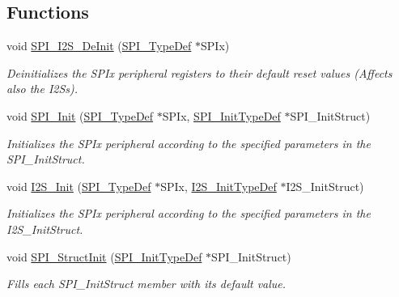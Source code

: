 \subsection*{Functions}
\begin{DoxyCompactItemize}
\item 
void \hyperlink{group___s_p_i___exported___functions_gabe36880945fa56785283a9c0092124cc}{S\+P\+I\+\_\+\+I2\+S\+\_\+\+De\+Init} (\hyperlink{struct_s_p_i___type_def}{S\+P\+I\+\_\+\+Type\+Def} $\ast$S\+P\+Ix)
\begin{DoxyCompactList}\small\item\em Deinitializes the S\+P\+Ix peripheral registers to their default reset values (Affects also the I2\+Ss). \end{DoxyCompactList}\item 
void \hyperlink{group___s_p_i___exported___functions_ga8dacc1dc48bf08c0f12da409f4889037}{S\+P\+I\+\_\+\+Init} (\hyperlink{struct_s_p_i___type_def}{S\+P\+I\+\_\+\+Type\+Def} $\ast$S\+P\+Ix, \hyperlink{struct_s_p_i___init_type_def}{S\+P\+I\+\_\+\+Init\+Type\+Def} $\ast$S\+P\+I\+\_\+\+Init\+Struct)
\begin{DoxyCompactList}\small\item\em Initializes the S\+P\+Ix peripheral according to the specified parameters in the S\+P\+I\+\_\+\+Init\+Struct. \end{DoxyCompactList}\item 
void \hyperlink{group___s_p_i___exported___functions_ga53661884ae4a9640df7cbc59187782f7}{I2\+S\+\_\+\+Init} (\hyperlink{struct_s_p_i___type_def}{S\+P\+I\+\_\+\+Type\+Def} $\ast$S\+P\+Ix, \hyperlink{struct_i2_s___init_type_def}{I2\+S\+\_\+\+Init\+Type\+Def} $\ast$I2\+S\+\_\+\+Init\+Struct)
\begin{DoxyCompactList}\small\item\em Initializes the S\+P\+Ix peripheral according to the specified parameters in the I2\+S\+\_\+\+Init\+Struct. \end{DoxyCompactList}\item 
void \hyperlink{group___s_p_i___exported___functions_ga9a0116f88cc2c4478c270f05608703f1}{S\+P\+I\+\_\+\+Struct\+Init} (\hyperlink{struct_s_p_i___init_type_def}{S\+P\+I\+\_\+\+Init\+Type\+Def} $\ast$S\+P\+I\+\_\+\+Init\+Struct)
\begin{DoxyCompactList}\small\item\em Fills each S\+P\+I\+\_\+\+Init\+Struct member with its default value. \end{DoxyCompactList}\item 

\end{DoxyCompactItemize}
